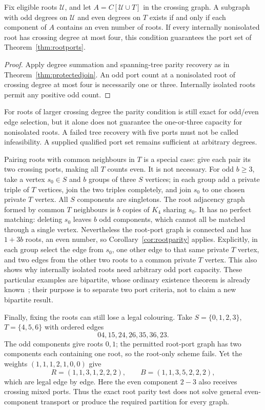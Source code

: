 \begin{corollary}\label{cor:rootparity}
Fix eligible roots $\mathcal U$, and let
$A=C[\mathcal U\cup T]$ in the crossing graph. A subgraph with odd
degrees on $\mathcal U$ and even degrees on $T$ exists if and only if
each component of $A$ contains an even number of roots. If every
internally nonisolated root has crossing degree at most four, this
condition guarantees the port set of Theorem~\ref{thm:rootports}.
\end{corollary}
\begin{proof}
Apply degree summation and spanning-tree parity recovery as in
Theorem~\ref{thm:protectedjoin}. An odd port count at a nonisolated
root of crossing degree at most four is necessarily one or three.
Internally isolated roots permit any positive odd count.
\end{proof}

For roots of larger crossing degree the parity condition is still exact
for odd/even edge selection, but it alone does not guarantee the
one-or-three capacity for nonisolated roots. A failed tree recovery with
five ports must not be called infeasibility. A supplied qualified port
set remains sufficient at arbitrary degrees.

Pairing roots with common neighbours in $T$ is a special case: give
each pair its two crossing ports, making all $T$ counts even. It is not
necessary. For odd $b\ge3$, take a vertex $s_0\in S$ and $b$ groups of
three $S$ vertices; in each group add a private triple of $T$ vertices,
join the two triples completely, and join $s_0$ to one chosen private
$T$ vertex. All $S$ components are singletons. The root adjacency graph
formed by common $T$ neighbours is $b$ copies of $K_4$ sharing $s_0$.
It has no perfect matching: deleting $s_0$ leaves $b$ odd components,
which cannot all be matched through a single vertex. Nevertheless the
root-port graph is connected and has $1+3b$ roots, an even number, so
Corollary~\ref{cor:rootparity} applies. Explicitly, in each group select
the edge from $s_0$, one other edge to that same private $T$ vertex,
and two edges from the other two roots to a common private $T$ vertex.
This also shows why internally isolated roots need arbitrary odd port
capacity. These particular examples are bipartite, whose ordinary
existence theorem is already known~\cite{GW23}; their purpose is to
separate two port criteria, not to claim a new bipartite result.

Finally, fixing the roots can still lose a legal colouring. Take
$S=\{0,1,2,3\}$, $T=\{4,5,6\}$ with ordered edges
\[
 04,15,24,26,35,36,23.
\]
The odd components give roots $0,1$; the permitted root-port graph
has two components each containing one root, so the root-only scheme
fails. Yet the weights $(1,1,1,2,1,0,0)$ give
\[
 R=(1,1,3,1,2,2,2),\qquad B=(1,1,3,5,2,2,2),
\]
which are legal edge by edge. Here the even component $2\! -\!3$
also receives crossing mixed ports. Thus the exact root parity test
does not solve general even-component transport or produce the required
partition for every graph.


